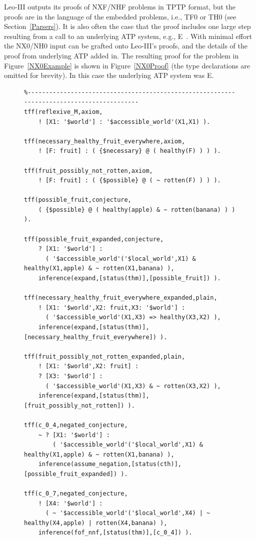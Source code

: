 \documentclass{ceurart}
\begin{document}
Leo-III outputs its proofs of NXF/NHF problems in TPTP format, but the proofs are in the language 
of the embedded problems, i.e., TF0 or TH0 (see Section~\ref{Parsers}).
It is also often the case that the proof includes one large step resulting from a call to an 
underlying ATP system, e.g., E~\cite{SCV19}.
With minimal effort the NX0/NH0 input can be grafted onto Leo-III's proofs, and the details of
the proof from underlying ATP added in.
The resulting proof for the problem in Figure~\ref{NX0Example} is shown in Figure~\ref{NX0Proof} 
(the type declarations are omitted for brevity).
In this case the underlying ATP system was E.

\begin{figure}[h!]
\centering
{\footnotesize
{\setlength{\baselineskip}{3mm}
\begin{verbatim}
%------------------------------------------------------------------------------------------
tff(reflexive_M,axiom,
    ! [X1: '$world'] : '$accessible_world'(X1,X1) ).

tff(necessary_healthy_fruit_everywhere,axiom,
    ! [F: fruit] : ( {$necessary} @ ( healthy(F) ) ) ).

tff(fruit_possibly_not_rotten,axiom,
    ! [F: fruit] : ( {$possible} @ ( ~ rotten(F) ) ) ).

tff(possible_fruit,conjecture,
    ( {$possible} @ ( healthy(apple) & ~ rotten(banana) ) ) ).

tff(possible_fruit_expanded,conjecture,
    ? [X1: '$world'] :
      ( '$accessible_world'('$local_world',X1) & healthy(X1,apple) & ~ rotten(X1,banana) ),
    inference(expand,[status(thm)],[possible_fruit]) ).

tff(necessary_healthy_fruit_everywhere_expanded,plain,
    ! [X1: '$world',X2: fruit,X3: '$world'] :
      ( '$accessible_world'(X1,X3) => healthy(X3,X2) ),
    inference(expand,[status(thm)],[necessary_healthy_fruit_everywhere]) ).

tff(fruit_possibly_not_rotten_expanded,plain,
    ! [X1: '$world',X2: fruit] :
    ? [X3: '$world'] :
      ( '$accessible_world'(X1,X3) & ~ rotten(X3,X2) ),
    inference(expand,[status(thm)],[fruit_possibly_not_rotten]) ).

tff(c_0_4,negated_conjecture,
    ~ ? [X1: '$world'] :
        ( '$accessible_world'('$local_world',X1) & healthy(X1,apple) & ~ rotten(X1,banana) ),
    inference(assume_negation,[status(cth)],[possible_fruit_expanded]) ).

tff(c_0_7,negated_conjecture,
    ! [X4: '$world'] :
      ( ~ '$accessible_world'('$local_world',X4) | ~ healthy(X4,apple) | rotten(X4,banana) ),
    inference(fof_nnf,[status(thm)],[c_0_4]) ).


\end{verbatim}}}
\end{figure}
\end{document}
